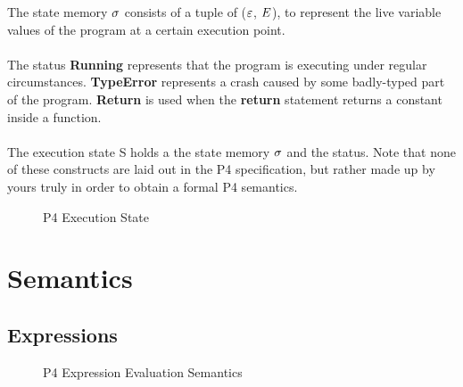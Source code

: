 \documentclass[UTF8]{article}
\begin{document}
The state memory $\sigma{}$ consists of a tuple of ($\varepsilon$, $E$), to represent the live variable values of the program at a certain execution point.
\\~\\
The status \textbf{Running} represents that the program is executing under regular circumstances. \textbf{TypeError} represents a crash caused by some badly-typed part of the program. \textbf{Return} is used when the \textbf{return} statement returns a constant inside a function.
\\~\\
The execution state S holds a the state memory $\sigma{}$ and the status. Note that none of these constructs are laid out in the P4 specification, but rather made up by yours truly in order to obtain a formal P4 semantics.
\begin{figure}[h!]
\centering\ottgrammartabular{
\ottstatus\ottinterrule
\ottstate\ottafterlastrule
}
\caption{P4 Execution State}
\label{fig:status}
\end{figure}

\section{Semantics}
\subsection{Expressions}

\begin{figure}[ht!]
\caption{P4 Expression Evaluation Semantics}
\label{fig:semexp}
\end{figure}
\end{document}
